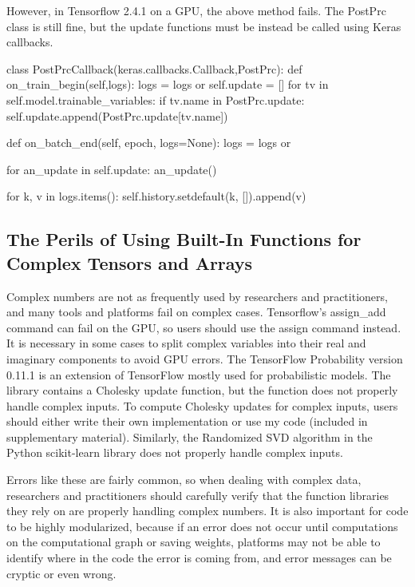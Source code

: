 However, in Tensorflow 2.4.1 on a GPU, the above method fails. The PostPrc class is still fine, but the update functions must be instead be called using Keras callbacks.
\begin{code}
class PostPrcCallback(keras.callbacks.Callback,PostPrc):
    def on_train_begin(self,logs):
        logs = logs or {}
        self.update = []
        for tv in self.model.trainable_variables:
            if tv.name in PostPrc.update:
                self.update.append(PostPrc.update[tv.name])

    def on_batch_end(self, epoch, logs=None):
        logs = logs or {}

        for an_update in self.update:
            an_update()

        for k, v in logs.items():
            self.history.setdefault(k, []).append(v)
\end{code}

\subsection{The Perils of Using Built-In Functions for Complex Tensors and Arrays}
Complex numbers are not as frequently used by researchers and practitioners, and many tools and platforms fail on complex cases.  Tensorflow's assign\_add command can fail on the GPU, so users should use the assign command instead. It is necessary in some cases to split complex variables into their real and imaginary components to avoid GPU errors. 
The TensorFlow Probability version 0.11.1 \cite{tensorflowprobability} is an extension of TensorFlow mostly used for probabilistic models. The library contains a Cholesky update function, but the function does not properly handle complex inputs. To compute Cholesky updates for complex inputs, users should either write their own implementation or use my code (included in supplementary material). Similarly, the Randomized SVD algorithm in the Python scikit-learn library does not properly handle complex inputs.

Errors like these are fairly common, so when dealing with complex data, researchers and practitioners should carefully verify that the function libraries they rely on are properly handling complex numbers. It is also important for code to be highly modularized, because if an error does not occur until computations on the computational graph or saving weights, platforms may not be able to identify where in the code the error is coming from, and error messages can be cryptic or even wrong.
